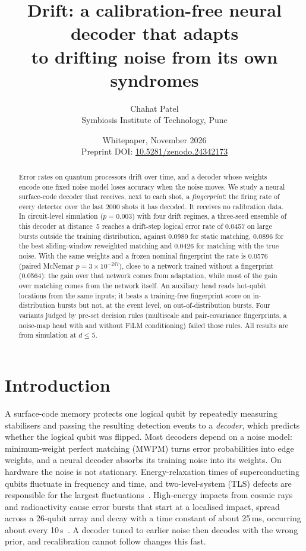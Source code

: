 \documentclass[11pt,a4paper]{article}
\title{\bfseries Drift: a calibration-free neural decoder that adapts\\to drifting noise from its own syndromes}
\author{Chahat Patel\\[2pt]\small Symbiosis Institute of Technology, Pune}
\date{\small Whitepaper, November 2026\\[2pt]
\small Preprint DOI: \href{https://doi.org/10.5281/zenodo.24342173}{10.5281/zenodo.24342173}}
\newcommand{\Eb}[2]{{#1}{\times}10^{-#2}}
\begin{document}
\maketitle

\begin{abstract}
\noindent
Error rates on quantum processors drift over time, and a decoder whose weights encode one fixed noise model
loses accuracy when the noise moves. We study a neural surface-code decoder that receives, next to each shot,
a \emph{fingerprint}: the firing rate of every detector over the last 2000 shots it has decoded. It receives no
calibration data. In circuit-level simulation ($p=0.003$) with four drift regimes, a three-seed ensemble of this
decoder at distance~5 reaches a drift-step logical error rate of 0.0457 on large bursts outside the training
distribution, against 0.0980 for static matching, 0.0896 for the best sliding-window reweighted matching and 0.0426
for matching with the true noise. With the same weights and a frozen nominal fingerprint the rate is 0.0576 (paired
McNemar $p=\Eb{3}{247}$), close to a network trained without a fingerprint (0.0564): the gain over that network
comes from adaptation, while most of the gain over matching comes from the network itself. An auxiliary head reads
hot-qubit locations from the same inputs; it beats a training-free fingerprint score on in-distribution bursts but
not, at the event level, on out-of-distribution bursts. Four variants judged by pre-set decision rules (multiscale and
pair-covariance fingerprints, a noise-map head with and without FiLM conditioning) failed those rules. All results
are from simulation at
$d\le5$.
\end{abstract}

\section{Introduction}\label{sec:intro}

A surface-code memory protects one logical qubit by repeatedly measuring stabilisers and passing the resulting
detection events to a \emph{decoder}, which predicts whether the logical qubit was flipped. Most decoders depend
on a noise model: minimum-weight perfect matching (MWPM) turns error probabilities into edge weights, and a
neural decoder absorbs its training noise into its weights. On hardware the noise is not stationary. Energy-relaxation
times of superconducting qubits fluctuate in frequency and time, and two-level-system (TLS) defects are responsible
for the largest fluctuations~\cite{klimov2018fluctuations}. High-energy impacts from cosmic rays and radioactivity
cause error bursts that start at a localised impact, spread across a 26-qubit array and decay with a time constant
of about 25\,ms, occurring about every 10\,s~\cite{mcewen2022cosmic}. A decoder tuned to earlier noise then decodes
with the wrong prior, and recalibration cannot follow changes this fast.
\end{document}
